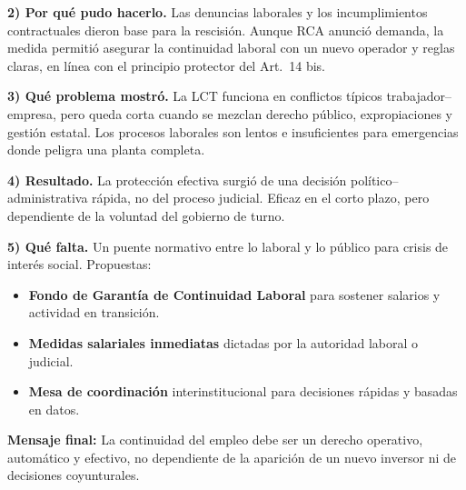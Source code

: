 \documentclass[]{informeutn}
\begin{document}
\medskip
\textbf{2) Por qué pudo hacerlo.} Las denuncias laborales y los incumplimientos contractuales dieron base para la
rescisión. Aunque RCA anunció demanda, la medida permitió asegurar la continuidad laboral con un nuevo operador
y reglas claras, en línea con el principio protector del Art.~14 bis.

\medskip
\textbf{3) Qué problema mostró.} La LCT funciona en conflictos típicos trabajador--empresa, pero queda corta cuando
se mezclan derecho público, expropiaciones y gestión estatal. Los procesos laborales son lentos e insuficientes
para emergencias donde peligra una planta completa.

\medskip
\textbf{4) Resultado.} La protección efectiva surgió de una decisión político--administrativa rápida, no del
proceso judicial. Eficaz en el corto plazo, pero dependiente de la voluntad del gobierno de turno.

\medskip
\textbf{5) Qué falta.} Un puente normativo entre lo laboral y lo público para crisis de interés social. Propuestas:
\begin{itemize}
  \item \textbf{Fondo de Garantía de Continuidad Laboral} para sostener salarios y actividad en transición.
  \item \textbf{Medidas salariales inmediatas} dictadas por la autoridad laboral o judicial.
  \item \textbf{Mesa de coordinación} interinstitucional para decisiones rápidas y basadas en datos.
\end{itemize}

\noindent\textbf{Mensaje final:} La continuidad del empleo debe ser un derecho operativo, automático y efectivo,
no dependiente de la aparición de un nuevo inversor ni de decisiones coyunturales.
\end{document}
